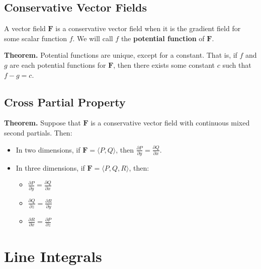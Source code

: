 \subsection{Conservative Vector Fields}
A vector field \( \mathbf{F} \) is a conservative vector field when it is the gradient field for some scalar function \( f \). We will call \( f \) the \textbf{potential function} of \( \mathbf{F} \).

\textbf{Theorem.} Potential functions are unique, except for a constant. That is, if \( f \) and \( g \) are each potential functions for \( \mathbf{F} \), then there exists some constant \( c \) such that \( f - g = c \).

\subsection{Cross Partial Property}
\textbf{Theorem.} Suppose that \( \mathbf{F} \) is a conservative vector field with continuous mixed second partials. Then:

\begin{itemize}
    \item In two dimensions, if \( \mathbf{F} = \langle P,Q \rangle \), then \( \frac{\partial P}{\partial y} = \frac{\partial Q}{\partial x} \).
    \item In three dimensions, if \( \mathbf{F} = \langle P, Q, R \rangle \), then:
    \begin{itemize}
        \item \( \frac{\partial P}{\partial y} = \frac{\partial Q}{\partial x} \)
        \item \( \frac{\partial Q}{\partial z} = \frac{\partial R}{\partial y} \)
        \item \( \frac{\partial R}{\partial x} = \frac{\partial P}{\partial z} \)
    \end{itemize}
\end{itemize}

\newpage

\section{Line Integrals}

